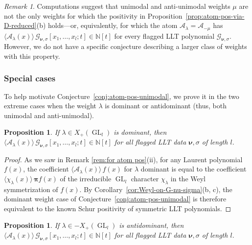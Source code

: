 \documentclass[12pt]{amsart}
\newtheorem{prop}[thm]{Proposition}
\theoremstyle{definition}
\theoremstyle{remark}
\newtheorem{remark}[thm]{Remark}
\newcommand{\NN}{{\mathbb N}}
\newcommand{\nubold}{{\boldsymbol \nu }}
\newcommand{\pibold}{{\boldsymbol \pi }}
\newcommand{\Weyl}{\pibold }
\newcommand{\Acal}{{\mathcal A}}
\newcommand{\Gcal}{{\mathcal G}}
\DeclareMathOperator{\GL}{GL}
\begin{document}
\begin{remark}\label{rem:other-special-mu}
Computations suggest that unimodal and anti-unimodal weights $\mu $
are not the only weights for which the positivity in
Proposition~\ref{prop:atom-pos-via-D-reduced}(b) holds---or,
equivalently, for which the atom $\Acal _{\lambda } = \Acal _{-\mu }$
has $\langle \Acal_{\lambda }(x) \rangle\, \Gcal _{\nubold ,\sigma
}[x_{1},\ldots,x_{l}; t]\in \NN [t]$ for every flagged LLT polynomial
$\Gcal _{\nubold ,\sigma }$.  However, we do not have a specific
conjecture describing a larger class of weights with this property.
\end{remark}

\subsubsection*{Special cases}

To help motivate Conjecture~\ref{conj:atom-pos-unimodal}, we prove it
in the two extreme cases when the weight $\lambda $ is dominant or
antidominant (thus, both unimodal and anti-unimodal).

\begin{prop}\label{prop:atom-pos-dominant}
If $\lambda \in X_{+}(\GL _{l})$ is dominant, then $\langle
\Acal_{\lambda }(x) \rangle\, \Gcal _{\nubold ,\sigma
}[x_{1},\ldots,x_{l}; t]\in \NN [t]$ for all flagged LLT data $\nubold
,\sigma $ of length $l$.
\end{prop}

\begin{proof}
As we saw in Remark \ref{rem:for atom pos}(ii), for any Laurent
polynomial $f(x)$, the coefficient $\langle \Acal _{\lambda }(x)
\rangle\, f(x)$ for $\lambda $ dominant is equal to the coefficient
$\langle \chi _{\lambda }(x) \rangle\, \Weyl f(x)$ of the irreducible
$\GL _{l}$ character $\chi _{\lambda }$ in the Weyl symmetrization of
$f(x)$.  By Corollary~\ref{cor:Weyl-on-G-nu-sigma}(b, c), the dominant
weight case of Conjecture~\ref{conj:atom-pos-unimodal} is therefore
equivalent to the known Schur positivity of symmetric LLT polynomials.
\end{proof}


\begin{prop}\label{prop:atom-pos-antidominant}
If $\lambda \in -X_{+}(\GL _{l})$ is antidominant, then $\langle
\Acal_{\lambda }(x) \rangle\, \Gcal _{\nubold ,\sigma
}[x_{1},\ldots,x_{l}; t]\in \NN [t]$ for all flagged LLT data $\nubold
,\sigma $ of length $l$.
\end{prop}
\end{document}
